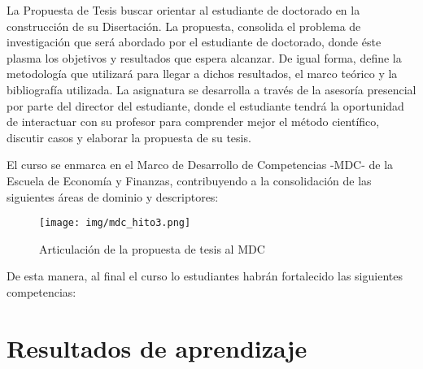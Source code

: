 La Propuesta de Tesis buscar orientar al estudiante de doctorado en la construcción de su Disertación. La propuesta, consolida el problema de investigación que será abordado por el estudiante de doctorado, donde éste plasma los objetivos y resultados que espera alcanzar. De igual forma, define la metodología que utilizará para llegar a dichos resultados, el marco teórico y la bibliografía utilizada.  La asignatura se desarrolla a través de la asesoría presencial por parte del director del estudiante, donde el estudiante tendrá la oportunidad de interactuar con su profesor para comprender mejor el método científico, discutir casos y elaborar la propuesta de su tesis.

El curso se enmarca en el Marco de Desarrollo de Competencias -MDC- de la Escuela de Economía y Finanzas, contribuyendo a la consolidación de las siguientes áreas de dominio y descriptores:

\begin{figure}[H]
\caption{Articulación de la propuesta de tesis al MDC \label{hito1_mdc} }
\begin{center}
\texttt{[image: img/mdc\_hito3.png]}
\end{center}
\end{figure}

De esta manera, al final el curso lo estudiantes habrán fortalecido las siguientes competencias:
 
\section{Resultados de aprendizaje}

